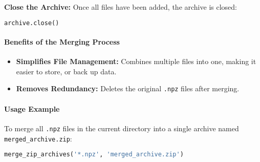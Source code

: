 \documentclass{article}
\begin{document}
			\textbf{Close the Archive:} Once all files have been added, the archive is closed:
			\begin{lstlisting}[language=Python]
				archive.close()
			\end{lstlisting}
			
			\paragraph{Benefits of the Merging Process}
			\begin{itemize}
				\item \textbf{Simplifies File Management:} Combines multiple files into one, making it easier to store, or back up data.
				\item \textbf{Removes Redundancy:} Deletes the original \texttt{.npz} files after merging.
				
			\end{itemize}
			
			\paragraph{Usage Example}
			To merge all \texttt{.npz} files in the current directory into a single archive named \texttt{merged\_archive.zip}:
			\begin{lstlisting}[language=Python]
				merge_zip_archives('*.npz', 'merged_archive.zip')
			\end{lstlisting}
			
			\begin{comment}
			
			\paragraph{Reading the Merged Archive}
			The resulting archive can be read directly using \texttt{numpy.load}:
			\begin{lstlisting}[language=Python]
				import numpy as np
				
				# Load the merged archive
				data = np.load('merged_archive.zip')
				
				# Access each array by its name
				for array_name in data:
					print(f"Array {array_name}: {data[array_name]}")
			\end{lstlisting}
			
			\paragraph{Key Considerations}
			\begin{itemize}
				\item \textbf{File Naming:} The \texttt{.npy} extension is removed in the merged archive for cleaner names.
				\item \textbf{Efficiency:} Merging reduces the overhead of managing multiple files, improving organization and ease of sharing.
				\item \textbf{Accessibility:} \texttt{numpy.load} ensures simple and efficient retrieval of arrays by their original names.
			\end{itemize}
				content...
			\end{comment}
			
\end{document}
